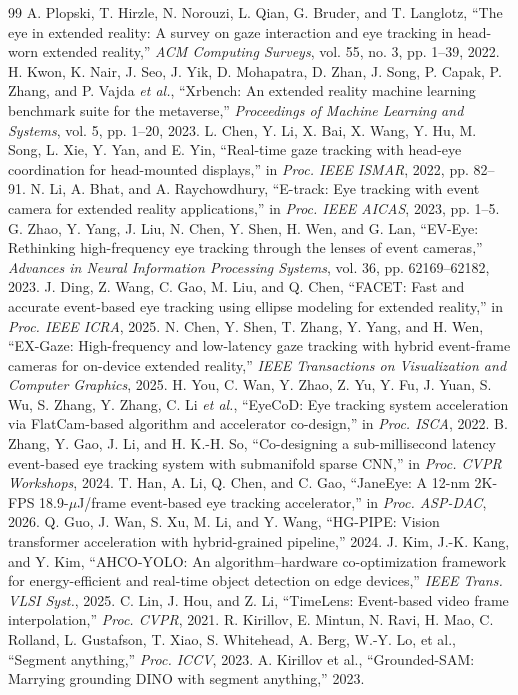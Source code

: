\documentclass[journal]{IEEEtran}
\newcommand{\etal}{\textit{et al.}}
\begin{document}
\begin{thebibliography}{99}
\footnotesize
{} A. Plopski, T. Hirzle, N. Norouzi, L. Qian, G. Bruder, and T. Langlotz, ``The eye in extended reality: A survey on gaze interaction and eye tracking in head-worn extended reality,'' \emph{ACM Computing Surveys}, vol. 55, no. 3, pp. 1--39, 2022.
 H. Kwon, K. Nair, J. Seo, J. Yik, D. Mohapatra, D. Zhan, J. Song, P. Capak, P. Zhang, and P. Vajda \etal, ``Xrbench: An extended reality machine learning benchmark suite for the metaverse,'' \emph{Proceedings of Machine Learning and Systems}, vol. 5, pp. 1--20, 2023.
 L. Chen, Y. Li, X. Bai, X. Wang, Y. Hu, M. Song, L. Xie, Y. Yan, and E. Yin, ``Real-time gaze tracking with head-eye coordination for head-mounted displays,'' in \emph{Proc. IEEE ISMAR}, 2022, pp. 82--91.
 N. Li, A. Bhat, and A. Raychowdhury, ``E-track: Eye tracking with event camera for extended reality applications,'' in \emph{Proc. IEEE AICAS}, 2023, pp. 1--5.
 G. Zhao, Y. Yang, J. Liu, N. Chen, Y. Shen, H. Wen, and G. Lan, ``EV-Eye: Rethinking high-frequency eye tracking through the lenses of event cameras,'' \emph{Advances in Neural Information Processing Systems}, vol. 36, pp. 62169--62182, 2023.
 J. Ding, Z. Wang, C. Gao, M. Liu, and Q. Chen, ``FACET: Fast and accurate event-based eye tracking using ellipse modeling for extended reality,'' in \emph{Proc. IEEE ICRA}, 2025.
 N. Chen, Y. Shen, T. Zhang, Y. Yang, and H. Wen, ``EX-Gaze: High-frequency and low-latency gaze tracking with hybrid event-frame cameras for on-device extended reality,'' \emph{IEEE Transactions on Visualization and Computer Graphics}, 2025.
 H. You, C. Wan, Y. Zhao, Z. Yu, Y. Fu, J. Yuan, S. Wu, S. Zhang, Y. Zhang, C. Li \etal, ``EyeCoD: Eye tracking system acceleration via FlatCam-based algorithm and accelerator co-design,'' in \emph{Proc. ISCA}, 2022.
 B. Zhang, Y. Gao, J. Li, and H. K.-H. So, ``Co-designing a sub-millisecond latency event-based eye tracking system with submanifold sparse CNN,'' in \emph{Proc. CVPR Workshops}, 2024.
 T. Han, A. Li, Q. Chen, and C. Gao, ``JaneEye: A 12-nm 2K-FPS 18.9-$\mu$J/frame event-based eye tracking accelerator,'' in \emph{Proc. ASP-DAC}, 2026.
 Q. Guo, J. Wan, S. Xu, M. Li, and Y. Wang, ``HG-PIPE: Vision transformer acceleration with hybrid-grained pipeline,'' 2024.
 J. Kim, J.-K. Kang, and Y. Kim, ``AHCO-YOLO: An algorithm--hardware co-optimization framework for energy-efficient and real-time object detection on edge devices,'' \emph{IEEE Trans. VLSI Syst.}, 2025.
 C. Lin, J. Hou, and Z. Li, ``TimeLens: Event-based video frame interpolation,'' \emph{Proc. CVPR}, 2021.
 R. Kirillov, E. Mintun, N. Ravi, H. Mao, C. Rolland, L. Gustafson, T. Xiao, S. Whitehead, A. Berg, W.-Y. Lo, et al., ``Segment anything,'' \emph{Proc. ICCV}, 2023.
 A. Kirillov et al., ``Grounded-SAM: Marrying grounding DINO with segment anything,'' 2023.
\end{thebibliography}
\end{document}
